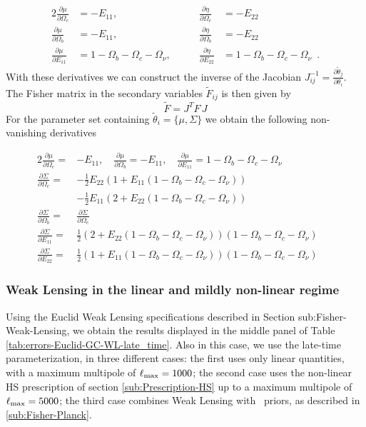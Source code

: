 \begin{alignat}{2}
\frac{\partial\mu}{\partial\Omega_{c}} & =-E_{11},\qquad &
\frac{\partial\eta}{\partial\Omega_{c}} & =-E_{22}\\
\frac{\partial\mu}{\partial\Omega_{b}} & =-E_{11},\qquad &
\frac{\partial\eta}{\partial\Omega_{b}} & =-E_{22}\\
\frac{\partial\mu}{\partial E_{11}} &
=1-\Omega_{b}-\Omega_{c}-\Omega_{\nu},\qquad & \frac{\partial\eta}{\partial
	E_{22}} & =1-\Omega_{b}-\Omega_{c}-\Omega_{\nu} \,\,\, .
\end{alignat}
With these derivatives we can construct the inverse of the Jacobian
$J_{ij}^{-1}=\frac{\partial\tilde{\theta}_{j}}{\partial\theta_{i}}$.
The Fisher matrix in the secondary variables $\tilde{F}{}_{ij}$ is
then given by 
\begin{equation}
\tilde{F}=J^{T}F\,J
\end{equation}
For the parameter set containing $\tilde{\theta}_{i}=\{\mu,\Sigma\}$
we obtain the following non-vanishing derivatives 
\done{}

\begin{alignat}{2}
\frac{\partial\mu}{\partial\Omega_{c}}  = & -E_{11}, \quad \frac{\partial\mu}{\partial\Omega_{b}}  =-E_{11} ,\quad \frac{\partial\mu}{\partial E_{11}} 
=1-\Omega_{b}-\Omega_{c}-\Omega_{\nu} & &\\
\frac{\partial\Sigma}{\partial\Omega_{c}} 
= & -\frac{1}{2}E_{22}(1+E_{11}(1-\Omega_{b}-\Omega_{c}-\Omega_{\nu})) & &\\
  & -\frac{1}{2}E_{11}(2+E_{22}(1-\Omega_{b}-\Omega_{c}-\Omega_{\nu})) &  & \nonumber \\
\frac{\partial\Sigma}{\partial\Omega_{b}}
= &  \frac{\partial\Sigma}{\partial\Omega_{c}}  \\
\frac{\partial\Sigma}{\partial E_{11}} 
= & \frac{1}{2}(2+E_{22}(1-\Omega_{b}-\Omega_{c}-\Omega_{\nu}))
(1-\Omega_{b}-\Omega_{c}-\Omega_{\nu}) & & \\
\frac{\partial\Sigma}{\partial E_{22}} 
= & \frac{1}{2}(1+E_{11}(1-\Omega_{b}-\Omega_{c}-\Omega_{\nu}))
(1-\Omega_{b}-\Omega_{c}-\Omega_{\nu}) & &
\end{alignat}

\subsubsection{Weak Lensing in the linear and mildly non-linear regime}

Using the Euclid Weak Lensing specifications described in Section
sub:Fisher-Weak-Lensing, we obtain the results displayed in
the middle panel of Table \ref{tab:errors-Euclid-GC-WL-late_time}. 
Also in this case, we use the late-time parameterization, in three different cases: 
the first uses only linear quantities, with a maximum multipole of $\ell_{\rm max}=1000$; 
the second case uses the non-linear HS prescription of section \ref{sub:Prescription-HS} 
up to a maximum multipole of $\ell_{\rm max}=5000$; the third case combines Weak Lensing with \planck\ priors, 
as described in \ref{sub:Fisher-Planck}.


